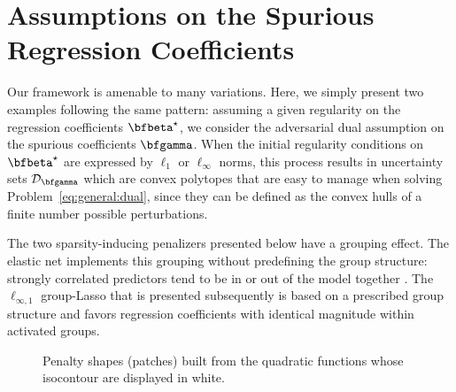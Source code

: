 \section{Assumptions on the Spurious Regression Coefficients \label{sec:quadra}}
\label{sec:gammaperturb}

Our framework is amenable to many variations.
Here, we simply present two examples following the same pattern:
assuming a given regularity on the regression coefficients $\bfbeta^\star$, we
consider the adversarial dual assumption on the spurious coefficients
$\bfgamma$.
When the initial regularity conditions on $\bfbeta^\star$ are expressed by
$\ell_1$ or $\ell_\infty$ norms, this process results in uncertainty sets
$\mathcal{D}_{\bfgamma}$ which are convex polytopes that are
easy to manage when solving Problem~\eqref{eq:general:dual}, since they
can be defined as the convex hulls of a finite number possible perturbations.

The two sparsity-inducing penalizers presented below have a grouping effect.
The elastic net implements this grouping without predefining the group
structure: strongly correlated predictors tend to be in or out of the model
together \citep{2005_JRSS_Zou}.  
The $\ell_{\infty,1}$ group-Lasso that is presented subsequently is based on a
prescribed group structure and favors regression coefficients with identical
magnitude within activated groups.

 

% 



%



\ifverylong
% 
% 
\begin{figure}
  \begin{center} 
    \caption{Penalty shapes (patches) built from the quadratic functions whose
             isocontour are displayed in white.}
    \label{fig:penalties}
    \end{center} 
\end{figure}
\fi

%
